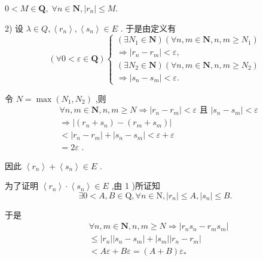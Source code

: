 $0 < M \in  \mathbf{Q},\;\forall n \in  \mathbf{N},\left| {r}_{n}\right|  \leq  M.$

2) 设 $\lambda  \in  Q,\left\langle  {r}_{n}\right\rangle  ,\left\langle  {s}_{n}\right\rangle   \in  E$ . 于是由定义有
$$\left( {\forall 0 < \varepsilon  \in  \mathbf{Q}}\right) \left\{  \begin{array}{l} \left( {\exists {N}_{1} \in  \mathbf{N}}\right) \left( {\forall n,m \in  \mathbf{N},n,m \geq  {N}_{1}}\right) \\   \Rightarrow  \left| {{r}_{n} - {r}_{m}}\right|  < \varepsilon , \\  \left( {\exists {N}_{2} \in  \mathbf{N}}\right) \left( {\forall n,m \in  \mathbf{N},n,m \geq  {N}_{2}}\right) \\   \Rightarrow  \left| {{s}_{n} - {s}_{m}}\right|  < \varepsilon . \end{array}\right.$$

令 $N = \max \left( {{N}_{1},{N}_{2}}\right)$ ,则
\begin{align*}
	&\forall n,m \in  \mathbf{N},n,m \geq  N \Rightarrow  \left| {{r}_{n} - {r}_{m}}\right|  < \varepsilon \text{ 且 }\left| {{s}_{n} - {s}_{m}}\right|  < \varepsilon\\
	&\Rightarrow  \left| {\left( {{r}_{n} + {s}_{n}}\right)  - \left( {{r}_{m} + {s}_{m}}\right) }\right|\\
	&< \left| {{r}_{n} - {r}_{m}}\right|  + \left| {{s}_{n} - {s}_{m}}\right|  < \varepsilon  + \varepsilon\\
	&= {2\varepsilon }\text{ . }
\end{align*}

因此 $\left\langle  {r}_{n}\right\rangle   + \left\langle  {s}_{n}\right\rangle   \in  E$ .

为了证明 $\left\langle  {r}_{n}\right\rangle   \cdot  \left\langle  {s}_{n}\right\rangle   \in  E$ ,由 1 )所证知
$$\exists 0 < A,B \in  \mathrm{Q},\forall n \in  \mathrm{N},\left| {r}_{n}\right|  \leq  A,\left| {s}_{n}\right|  \leq  B.$$

于是
\begin{align*}
	&\forall n,m \in  \mathbf{N},n,m \geq  N \Rightarrow  \left| {{r}_{n}{s}_{n} - {r}_{m}{s}_{m}}\right|\\
	&\leq  \left| {r}_{n}\right| \left| {{s}_{n} - {s}_{m}}\right|  + \left| {s}_{m}\right| \left| {{r}_{n} - {r}_{m}}\right|\\
	&< {A\varepsilon } + {B\varepsilon } = \left( {A + B}\right) {\varepsilon }_{ * }
\end{align*}


